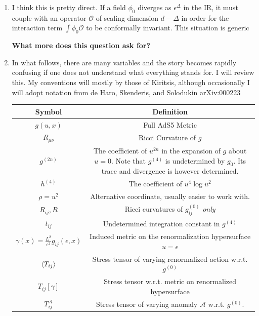 \documentclass[11pt, class=article, crop=false]{standalone}
\begin{document}
\begin{enumerate}
	
	\item I think this is pretty direct. If a field $\phi_0$ diverges as $\epsilon^{\Delta}$ in the IR, it must couple with an operator $\mathcal O$ of scaling dimension $d-\Delta$ in order for the interaction term $\int \phi_0 \mathcal O$ to be conformally invariant. This situation is generic
	
	\textbf{What more does this question ask for?}
	
	\item In what follows, there are many variables and the story becomes rapidly confusing if one does not understand what everything stands for. I will review this. My conventions will mostly by those of Kiritsis, although occasionally I will adopt notation from de Haro, Skenderis, and Solodukin arXiv:000223
	\begin{center}
		\begin{tabular}{c | c}
			Symbol & Definition\\
			\hline
			$g(u, x)$ & Full AdS5 Metric\\
			$R_{\mu \nu}$ & Ricci Curvature of $g$\\
			$g^{(2n)}$ & \parbox{4in}{\centering The coefficient of $u^{2n}$ in the expansion of $g$ about $u = 0$. \newline
			Note that $g^{(4)}$ is undetermined by $g_0$. Its trace and divergence is however determined.} \\
			$h^{(4)}$ & The coefficient of $u^4 \log u^2$\\
			$\rho = u^2$ & Alternative coordinate, usually easier to work with.\\ 
			$R_{ij}, R$ & Ricci curvatures of $g^{(0)}_{ij}$ \emph{only}\\
			$t_{ij}$ & Undetermined integration constant in  $g^{(4)}$\\
			$\gamma(x) = \frac{L^2}{\epsilon^2} g_{ij}(\epsilon, x)$ & Induced metric on the renormalization hypersurface $u = \epsilon$\\
			$\braket{T_{ij}}$ & Stress tensor of varying renormalized action w.r.t. $g^{(0)}$\\
			$T_{ij}[\gamma]$ & Stress tensor w.r.t. metric on renormalized hypersurface\\
			$T^{\mathcal A}_{ij}$ & Stress tensor of varying anomaly $\mathcal A$ w.r.t. $g^{(0)}$.
		\end{tabular}
	\end{center}
	

\end{enumerate}
\end{document}
